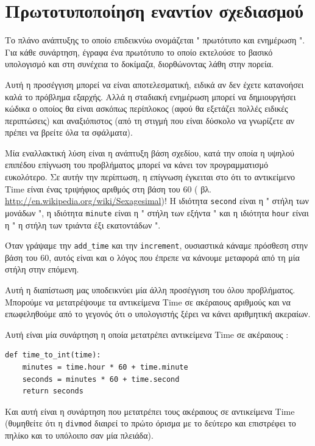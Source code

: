 \documentclass[10pt]{book}
\begin{document}
\section{Πρωτοτυποποίηση εναντίον σχεδιασμού}
\label{prototype}

Το πλάνο ανάπτυξης το οποίο επιδεικνύω ονομάζεται  " πρωτότυπο και ενημέρωση ".   Για κάθε συνάρτηση, έγραφα ένα πρωτότυπο το οποίο εκτελούσε το βασικό υπολογισμό και στη συνέχεια το δοκίμαζα, διορθώνοντας λάθη στην πορεία.

Αυτή η προσέγγιση μπορεί να είναι αποτελεσματική, ειδικά αν δεν έχετε κατανοήσει καλά το πρόβλημα εξαρχής.  Αλλά η σταδιακή ενημέρωση μπορεί να δημιουργήσει κώδικα ο οποίος θα είναι ασκόπως περίπλοκος (αφού θα εξετάζει πολλές ειδικές περιπτώσεις) και αναξιόπιστος (από τη στιγμή που είναι δύσκολο να γνωρίζετε αν πρέπει να βρείτε όλα τα σφάλματα).

Μία εναλλακτική λύση είναι η ανάπτυξη βάση σχεδίου, κατά την οποία η υψηλού επιπέδου 
επίγνωση του προβλήματος μπορεί να κάνει τον προγραμματισμό ευκολότερο.  Σε αυτήν την περίπτωση, η επίγνωση έγκειται στο ότι το αντικείμενο  Time  είναι ένας τριψήφιος αριθμός στη βάση του 60  ( βλ.  \url{http://en.wikipedia.org/wiki/Sexagesimal})!   Η ιδιότητα  {\tt second}  είναι η  " στήλη των μονάδων ",  η ιδιότητα  {\tt minute}  είναι η  " στήλη των εξήντα "  και η ιδιότητα  {\tt hour}  είναι η  " η στήλη των τριάντα έξι εκατοντάδων ". 

 Όταν γράψαμε την  \verb"add_time"  και την  {\tt increment},  ουσιαστικά κάναμε πρόσθεση στην βάση του 60, αυτός είναι και ο λόγος που έπρεπε να κάνουμε μεταφορά από τη μία στήλη στην επόμενη. 

Αυτή η διαπίστωση μας υποδεικνύει μία άλλη προσέγγιση του όλου προβλήματος.  Μπορούμε να μετατρέψουμε τα αντικείμενα  Time  σε ακέραιους αριθμούς και να επωφεληθούμε από το γεγονός ότι ο υπολογιστής ξέρει να κάνει αριθμητική ακεραίων.

Αυτή είναι μία συνάρτηση η οποία μετατρέπει αντικείμενα  Time  σε ακέραιους :

\begin{verbatim}
def time_to_int(time):
    minutes = time.hour * 60 + time.minute
    seconds = minutes * 60 + time.second
    return seconds
\end{verbatim}
%
 Και αυτή είναι η συνάρτηση που μετατρέπει τους ακέραιους σε αντικείμενα  Time  (θυμηθείτε ότι η  {\tt divmod}  διαιρεί το πρώτο όρισμα με το δεύτερο και επιστρέφει το πηλίκο και το υπόλοιπο σαν μία πλειάδα). 
\end{document}
